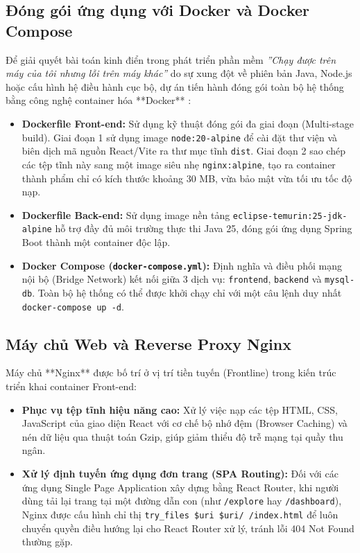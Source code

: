 \subsection{Đóng gói ứng dụng với Docker và Docker Compose}
Để giải quyết bài toán kinh điển trong phát triển phần mềm \textit{''Chạy được trên máy của tôi nhưng lỗi trên máy khác''} do sự xung đột về phiên bản Java, Node.js hoặc cấu hình hệ điều hành cục bộ, dự án tiến hành đóng gói toàn bộ hệ thống bằng công nghệ container hóa **Docker** \cite{docker2024}:
\begin{itemize}[leftmargin=1.5cm]
    \item \textbf{Dockerfile Front-end:} Sử dụng kỹ thuật đóng gói đa giai đoạn (Multi-stage build). Giai đoạn 1 sử dụng image \texttt{node:20-alpine} để cài đặt thư viện và biên dịch mã nguồn React/Vite ra thư mục tĩnh \texttt{dist}. Giai đoạn 2 sao chép các tệp tĩnh này sang một image siêu nhẹ \texttt{nginx:alpine}, tạo ra container thành phẩm chỉ có kích thước khoảng $30$ MB, vừa bảo mật vừa tối ưu tốc độ nạp.
    \item \textbf{Dockerfile Back-end:} Sử dụng image nền tảng \texttt{eclipse-temurin:25-jdk-alpine} hỗ trợ đầy đủ môi trường thực thi Java 25, đóng gói ứng dụng Spring Boot thành một container độc lập.
    \item \textbf{Docker Compose (\texttt{docker-compose.yml}):} Định nghĩa và điều phối mạng nội bộ (Bridge Network) kết nối giữa 3 dịch vụ: \texttt{frontend}, \texttt{backend} và \texttt{mysql-db}. Toàn bộ hệ thống có thể được khởi chạy chỉ với một câu lệnh duy nhất \texttt{docker-compose up -d}.
\end{itemize}

\subsection{Máy chủ Web và Reverse Proxy Nginx}
Máy chủ **Nginx** được bố trí ở vị trí tiền tuyến (Frontline) trong kiến trúc triển khai container Front-end:
\begin{itemize}[leftmargin=1.5cm]
    \item \textbf{Phục vụ tệp tĩnh hiệu năng cao:} Xử lý việc nạp các tệp HTML, CSS, JavaScript của giao diện React với cơ chế bộ nhớ đệm (Browser Caching) và nén dữ liệu qua thuật toán Gzip, giúp giảm thiểu độ trễ mạng tại quầy thu ngân.
    \item \textbf{Xử lý định tuyến ứng dụng đơn trang (SPA Routing):} Đối với các ứng dụng Single Page Application xây dựng bằng React Router, khi người dùng tải lại trang tại một đường dẫn con (như \texttt{/explore} hay \texttt{/dashboard}), Nginx được cấu hình chỉ thị \texttt{try\_files \$uri \$uri/ /index.html} để luôn chuyển quyền điều hướng lại cho React Router xử lý, tránh lỗi 404 Not Found thường gặp.
\end{itemize}

